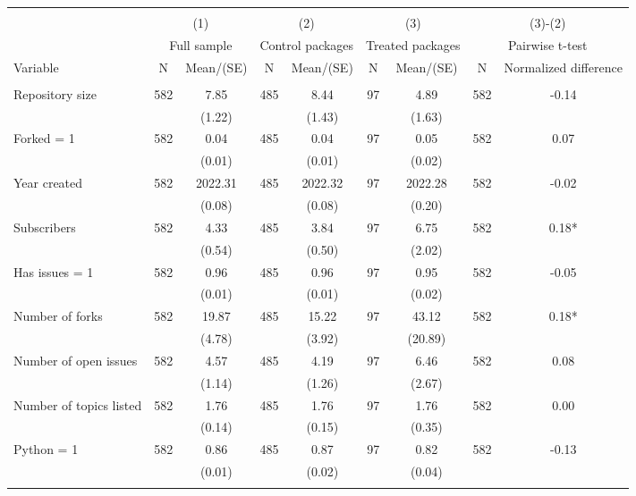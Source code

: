\begin{tabular}{@{\extracolsep{5pt}}lcccccccc}
\\[-1.8ex]\hline \hline \\[-1.8ex]
 & \multicolumn{2}{c}{(1)}  & \multicolumn{2}{c}{(2)}  & \multicolumn{2}{c}{(3)}  & \multicolumn{2}{c}{(3)-(2)} \\
 & \multicolumn{2}{c}{Full sample}  & \multicolumn{2}{c}{Control packages}  & \multicolumn{2}{c}{Treated packages}  & \multicolumn{2}{c}{Pairwise t-test}  \\
Variable & N & Mean/(SE) & N & Mean/(SE) & N & Mean/(SE) & N & Normalized difference \\ \hline \\[-1.8ex] 
Repository size   & 582    & 7.85    & 485    & 8.44    & 97    & 4.89    & 582    & -0.14   \\
 &   & (1.22)  &   & (1.43)  &   & (1.63)  &   &  \\ [1ex]
Forked = 1   & 582    & 0.04    & 485    & 0.04    & 97    & 0.05    & 582    & 0.07   \\
 &   & (0.01)  &   & (0.01)  &   & (0.02)  &   &  \\ [1ex]
Year created   & 582    & 2022.31    & 485    & 2022.32    & 97    & 2022.28    & 582    & -0.02   \\
 &   & (0.08)  &   & (0.08)  &   & (0.20)  &   &  \\ [1ex]
Subscribers   & 582    & 4.33    & 485    & 3.84    & 97    & 6.75    & 582    & 0.18*   \\
 &   & (0.54)  &   & (0.50)  &   & (2.02)  &   &  \\ [1ex]
Has issues = 1   & 582    & 0.96    & 485    & 0.96    & 97    & 0.95    & 582    & -0.05   \\
 &   & (0.01)  &   & (0.01)  &   & (0.02)  &   &  \\ [1ex]
Number of forks   & 582    & 19.87    & 485    & 15.22    & 97    & 43.12    & 582    & 0.18*   \\
 &   & (4.78)  &   & (3.92)  &   & (20.89)  &   &  \\ [1ex]
Number of open issues   & 582    & 4.57    & 485    & 4.19    & 97    & 6.46    & 582    & 0.08   \\
 &   & (1.14)  &   & (1.26)  &   & (2.67)  &   &  \\ [1ex]
Number of topics listed   & 582    & 1.76    & 485    & 1.76    & 97    & 1.76    & 582    & 0.00   \\
 &   & (0.14)  &   & (0.15)  &   & (0.35)  &   &  \\ [1ex]
Python = 1   & 582    & 0.86    & 485    & 0.87    & 97    & 0.82    & 582    & -0.13   \\
 &   & (0.01)  &   & (0.02)  &   & (0.04)  &   &  \\ [1ex]
\hline \hline \\[-1.8ex]

\end{tabular}
